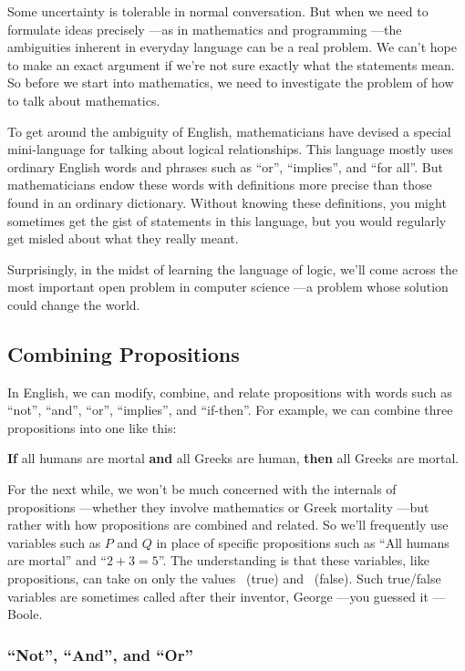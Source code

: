 Some uncertainty is tolerable in normal conversation.  But when we need to
formulate ideas precisely ---as in mathematics and programming ---the
ambiguities inherent in everyday language can be a real problem.  We can't
hope to make an exact argument if we're not sure exactly what the
statements mean.  So before we start into mathematics, we need to
investigate the problem of how to talk about mathematics.

To get around the ambiguity of English, mathematicians have devised a
special mini-language for talking about logical relationships.  This
language mostly uses ordinary English words and phrases such as ``or'',
``implies'', and ``for all''.  But mathematicians endow these words with
definitions more precise than those found in an ordinary dictionary.
Without knowing these definitions, you might sometimes get the gist of
statements in this language, but you would regularly get misled about what
they really meant.

Surprisingly, in the midst of learning the language of logic, we'll
come across the most important open problem in computer science ---a
problem whose solution could change the world.

\subsection{Combining Propositions}

In English, we can modify, combine, and relate propositions with words
such as ``not'', ``and'', ``or'', ``implies'', and ``if-then''.
For example, we can combine three propositions into one like this:
%
\begin{center}
\textbf{If} all humans are mortal \textbf{and} all Greeks are human,
\textbf{then} all Greeks are mortal.
\end{center}

For the next while, we won't be much concerned with the internals of
propositions ---whether they involve mathematics or Greek mortality ---but
rather with how propositions are combined and related.  So we'll
frequently use variables such as $P$ and $Q$ in place of specific
propositions such as ``All humans are mortal'' and ``$2 + 3 = 5$''.  The
understanding is that these variables, like propositions, can take on only
the values \true ~(true) and \false ~(false).  Such true/false variables are
sometimes called  after their inventor, George
---you guessed it ---Boole.

\subsubsection{``Not'', ``And'', and ``Or''}

